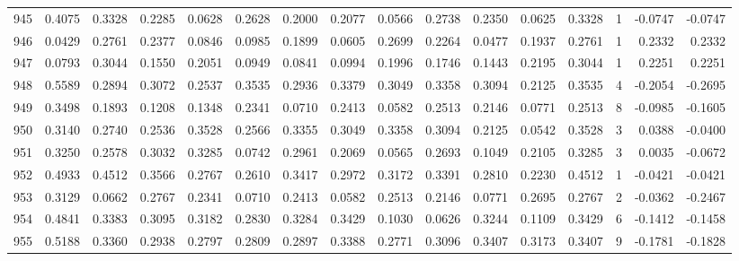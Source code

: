 \begin{tabular}{lrrrrrrrrrrrrrrr}
945 &      0.4075 &  0.3328 &  0.2285 &  0.0628 &  0.2628 &  0.2000 &  0.2077 &  0.0566 &  0.2738 &  0.2350 &   0.0625 &     0.3328 &      1 &                   -0.0747 &                    -0.0747 \\
946 &      0.0429 &  0.2761 &  0.2377 &  0.0846 &  0.0985 &  0.1899 &  0.0605 &  0.2699 &  0.2264 &  0.0477 &   0.1937 &     0.2761 &      1 &                    0.2332 &                     0.2332 \\
947 &      0.0793 &  0.3044 &  0.1550 &  0.2051 &  0.0949 &  0.0841 &  0.0994 &  0.1996 &  0.1746 &  0.1443 &   0.2195 &     0.3044 &      1 &                    0.2251 &                     0.2251 \\
948 &      0.5589 &  0.2894 &  0.3072 &  0.2537 &  0.3535 &  0.2936 &  0.3379 &  0.3049 &  0.3358 &  0.3094 &   0.2125 &     0.3535 &      4 &                   -0.2054 &                    -0.2695 \\
949 &      0.3498 &  0.1893 &  0.1208 &  0.1348 &  0.2341 &  0.0710 &  0.2413 &  0.0582 &  0.2513 &  0.2146 &   0.0771 &     0.2513 &      8 &                   -0.0985 &                    -0.1605 \\
950 &      0.3140 &  0.2740 &  0.2536 &  0.3528 &  0.2566 &  0.3355 &  0.3049 &  0.3358 &  0.3094 &  0.2125 &   0.0542 &     0.3528 &      3 &                    0.0388 &                    -0.0400 \\
951 &      0.3250 &  0.2578 &  0.3032 &  0.3285 &  0.0742 &  0.2961 &  0.2069 &  0.0565 &  0.2693 &  0.1049 &   0.2105 &     0.3285 &      3 &                    0.0035 &                    -0.0672 \\
952 &      0.4933 &  0.4512 &  0.3566 &  0.2767 &  0.2610 &  0.3417 &  0.2972 &  0.3172 &  0.3391 &  0.2810 &   0.2230 &     0.4512 &      1 &                   -0.0421 &                    -0.0421 \\
953 &      0.3129 &  0.0662 &  0.2767 &  0.2341 &  0.0710 &  0.2413 &  0.0582 &  0.2513 &  0.2146 &  0.0771 &   0.2695 &     0.2767 &      2 &                   -0.0362 &                    -0.2467 \\
954 &      0.4841 &  0.3383 &  0.3095 &  0.3182 &  0.2830 &  0.3284 &  0.3429 &  0.1030 &  0.0626 &  0.3244 &   0.1109 &     0.3429 &      6 &                   -0.1412 &                    -0.1458 \\
955 &      0.5188 &  0.3360 &  0.2938 &  0.2797 &  0.2809 &  0.2897 &  0.3388 &  0.2771 &  0.3096 &  0.3407 &   0.3173 &     0.3407 &      9 &                   -0.1781 &                    -0.1828 \\

\end{tabular}
